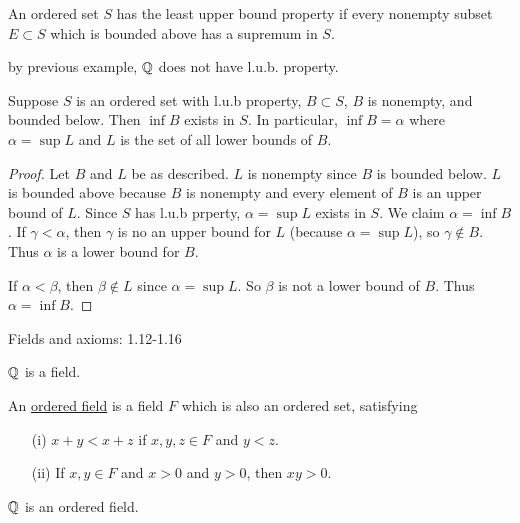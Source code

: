 \documentclass[]{article}
\begin{document}
\begin{definition}
	An ordered set $S$ has the least upper bound property if every nonempty subset $E\subset S$ which is bounded above has a supremum in $S$.
\end{definition}
\begin{note}
	by previous example, $\mathbb{Q}$ does not have l.u.b. property.
\end{note}

\begin{theorem}
	Suppose $S$ is an ordered set with l.u.b property, $B\subset S$, $B$ is nonempty, and bounded below. Then $\inf B$ exists in $S$.
	In particular, $\inf B=\alpha$ where $\alpha = \sup L$ and $L$ is the set of all lower bounds of $B$.
\end{theorem}
\begin{proof}
	Let $B$ and $L$ be as described. $L$ is nonempty since $B$ is bounded below. $L$ is bounded above because $B$ is nonempty and every element of $B$ is an upper bound of $L$.
	Since $S$ has l.u.b prperty, $\alpha=\sup L$ exists in $S$. We claim $\alpha=\inf B$.
	If $\gamma<\alpha$, then $\gamma$ is no an upper bound for $L$ (because $\alpha=\sup L$), so $\gamma\notin B$.
	Thus $\alpha$ is a lower bound for $B$.

	If $\alpha < \beta$, then $\beta\notin L$ since $\alpha=\sup L$.
	So $\beta$ is not a lower bound of $B$.
	Thus $\alpha=\inf B$.
\end{proof}

Fields and axioms: 1.12-1.16

\begin{example}
	$\mathbb{Q}$ is a field.
\end{example}

\begin{definition}
	An \ul{ordered field} is a field $F$ which is also an ordered set, satisfying
	\begin{enumerate}
		\item[(i)] $x+y<x+z$ if $x,y,z\in F$ and $y<z$.
		\item[(ii)] If $x,y\in F$ and $x>0$ and $y>0$, then $xy>0$.
	\end{enumerate}
\end{definition}
\begin{note}
	$\mathbb{Q}$ is an ordered field.
\end{note}
\end{document}

